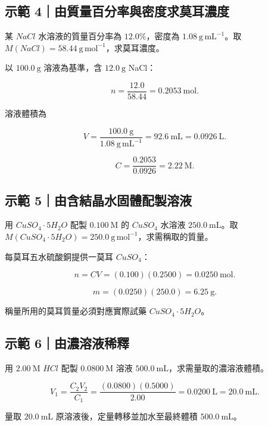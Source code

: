 \documentclass[11pt,a4paper]{article}
\begin{document}
\begin{HandoutWorkedExample}

\subsection{示範 4｜由質量百分率與密度求莫耳濃度}\label{ux793aux7bc4-4ux7531ux8ceaux91cfux767eux5206ux7387ux8207ux5bc6ux5ea6ux6c42ux83abux8033ux6fc3ux5ea6}

某 \(NaCl\) 水溶液的質量百分率為 \(12.0\%\)，密度為 \(1.08\ \mathrm{g\,mL^{-1}}\)。取 \(M(NaCl)=58.44\ \mathrm{g\,mol^{-1}}\)，求莫耳濃度。

以 \(100.0\ \mathrm g\) 溶液為基準，含 \(12.0\ \mathrm g\) NaCl：

\[
n=\frac{12.0}{58.44}=0.2053\ \mathrm{mol}.
\]

溶液體積為

\[
V=\frac{100.0\ \mathrm g}{1.08\ \mathrm{g\,mL^{-1}}}
=92.6\ \mathrm{mL}=0.0926\ \mathrm L.
\]

\[
C=\frac{0.2053}{0.0926}=2.22\ \mathrm M.
\]

\end{HandoutWorkedExample}

\begin{HandoutWorkedExample}

\subsection{示範 5｜由含結晶水固體配製溶液}\label{ux793aux7bc4-5ux7531ux542bux7d50ux6676ux6c34ux56faux9ad4ux914dux88fdux6eb6ux6db2}

用 \(CuSO_4\cdot5H_2O\) 配製 \(0.100\ \mathrm M\) 的 \(CuSO_4\) 水溶液 \(250.0\ \mathrm{mL}\)。取 \(M(CuSO_4\cdot5H_2O)=250.0\ \mathrm{g\,mol^{-1}}\)，求需稱取的質量。

每莫耳五水硫酸銅提供一莫耳 \(CuSO_4\)：

\[
n=CV=(0.100)(0.2500)=0.0250\ \mathrm{mol}.
\]

\[
m=(0.0250)(250.0)=6.25\ \mathrm g.
\]

稱量所用的莫耳質量必須對應實際試藥 \(CuSO_4\cdot5H_2O\)。

\end{HandoutWorkedExample}

\begin{HandoutWorkedExample}

\subsection{示範 6｜由濃溶液稀釋}\label{ux793aux7bc4-6ux7531ux6fc3ux6eb6ux6db2ux7a00ux91cb}

用 \(2.00\ \mathrm M\) \(HCl\) 配製 \(0.0800\ \mathrm M\) 溶液 \(500.0\ \mathrm{mL}\)，求需量取的濃溶液體積。

\[
V_1=\frac{C_2V_2}{C_1}
=\frac{(0.0800)(0.5000)}{2.00}
=0.0200\ \mathrm L=20.0\ \mathrm{mL}.
\]

量取 \(20.0\ \mathrm{mL}\) 原溶液後，定量轉移並加水至最終體積 \(500.0\ \mathrm{mL}\)。

\end{HandoutWorkedExample}
\end{document}
